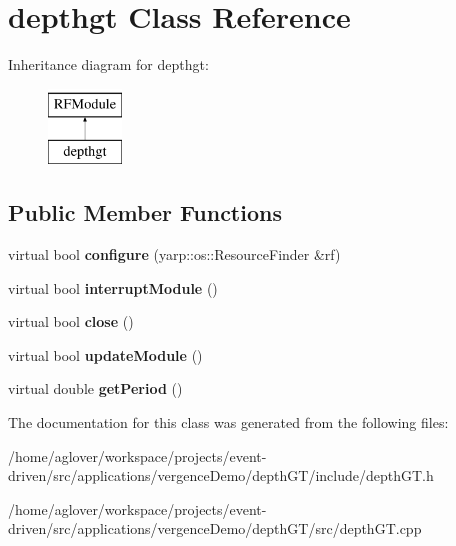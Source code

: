 \hypertarget{classdepthgt}{}\section{depthgt Class Reference}
\label{classdepthgt}
Inheritance diagram for depthgt\+:\begin{figure}[H]
\begin{center}
\leavevmode
\includegraphics[height=2.000000cm]{classdepthgt}
\end{center}
\end{figure}
\subsection*{Public Member Functions}
\begin{DoxyCompactItemize}
\item 
virtual bool {\bfseries configure} (yarp\+::os\+::\+Resource\+Finder \&rf)\hypertarget{classdepthgt_a336b0e92729120b58670b48ef1704958}{}\label{classdepthgt_a336b0e92729120b58670b48ef1704958}

\item 
virtual bool {\bfseries interrupt\+Module} ()\hypertarget{classdepthgt_a661af7f059e66db284b68a9dd3008b36}{}\label{classdepthgt_a661af7f059e66db284b68a9dd3008b36}

\item 
virtual bool {\bfseries close} ()\hypertarget{classdepthgt_a00c5ecbadb3e09bb45eb2d5663bf8f1f}{}\label{classdepthgt_a00c5ecbadb3e09bb45eb2d5663bf8f1f}

\item 
virtual bool {\bfseries update\+Module} ()\hypertarget{classdepthgt_acb37ecb3e34c1f47dd6c6cb3c167afdb}{}\label{classdepthgt_acb37ecb3e34c1f47dd6c6cb3c167afdb}

\item 
virtual double {\bfseries get\+Period} ()\hypertarget{classdepthgt_ab49d8668b437e2d89e2462625f009962}{}\label{classdepthgt_ab49d8668b437e2d89e2462625f009962}

\end{DoxyCompactItemize}


The documentation for this class was generated from the following files\+:\begin{DoxyCompactItemize}
\item 
/home/aglover/workspace/projects/event-\/driven/src/applications/vergence\+Demo/depth\+G\+T/include/depth\+G\+T.\+h\item 
/home/aglover/workspace/projects/event-\/driven/src/applications/vergence\+Demo/depth\+G\+T/src/depth\+G\+T.\+cpp\end{DoxyCompactItemize}
